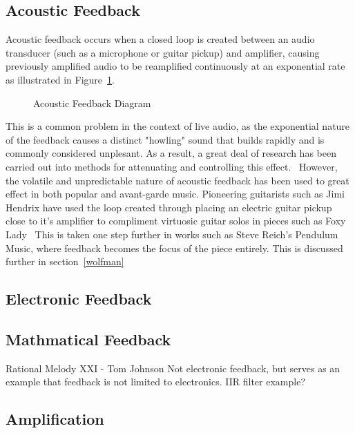 \documentclass[titlepage]{scrartcl}
\begin{document}
    \subsection{Acoustic Feedback}
    Acoustic feedback occurs when a closed loop is created between an audio
    transducer (such as a microphone or guitar pickup) and amplifier,
    causing previously amplified audio to be reamplified continuously at an
    exponential rate as illustrated in Figure~\ref{acoustic_feedback}.\\
    \begin{figure}[H]
        \caption[Caption for LOF]{Acoustic Feedback Diagram\protect\footnotemark}
        \label{acoustic_feedback}
    \end{figure}


    This is a common problem in the context of live audio, as the
    exponential nature of the feedback causes a distinct "howling" sound
    that builds rapidly and is commonly considered unplesant. As a result,
    a great deal of research has been carried out into methods for
    attenuating and controlling this effect.~\parencite[p.1]{}
    However, the volatile and unpredictable nature of acoustic feedback has
    been used to great effect in both popular and avant-garde music.
    Pioneering guitarists such as Jimi Hendrix have used the loop created
    through placing an electric guitar pickup close to it's amplifier to
    compliment virtuosic guitar solos in pieces such as Foxy Lady~\citeyearpar{}
    This is taken one step further in works such as Steve Reich's Pendulum
    Music, where feedback becomes the focus of the piece entirely. This is
    discussed further in section~\ref{wolfman}
    
    \subsection{Electronic Feedback}
    \subsection{Mathmatical Feedback}
    Rational Melody XXI - Tom Johnson
    Not electronic feedback, but serves as an example that feedback is not
    limited to electronics.
    IIR filter example?
    \subsection{Amplification}
\end{document}
